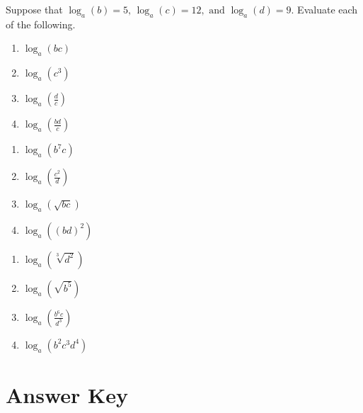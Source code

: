 Suppose that $\log_a(b) = 5, \, \log_a(c) = 12, \text{ and } \log_a(d) = 9$. Evaluate each of the following.
\begin{multicols}{4}
\begin{enumerate}	\setcounter{enumi}{\value{Review}}
	\item $\log_a(bc)$	
    \item $\log_a(c^3)$	
    \item $\log_a\left(\frac{d}{c}\right)$
    \item $\log_a\left(\frac{bd}{c}\right)$
\end{enumerate}	\setcounter{Review}{\value{enumi}}
\end{multicols}
\begin{multicols}{4}
\begin{enumerate}	\setcounter{enumi}{\value{Review}}
    \item $\log_a\left(b^7c\right)$	
    \item $\log_a\left(\frac{c^2}{d}\right)$
    \item $\log_a\left(\sqrt{bc}\right)$	
    \item $\log_a\left((bd)^2\right)$	
\end{enumerate}	\setcounter{Review}{\value{enumi}}
\end{multicols}
\begin{multicols}{4}
\begin{enumerate}	\setcounter{enumi}{\value{Review}}
    \item $\log_a\left(\sqrt[3]{d^2}\right)$	
    \item $\log_a\left(\sqrt{b^5}\right)$	
    \item $\log_a\left(\frac{b^6c}{d^3}\right)$
    \item $\log_a\left(b^2c^3d^4\right)$	
\end{enumerate}
\setcounter{Review}{\value{enumi}}
\end{multicols}

\newpage

\section{Answer Key}

